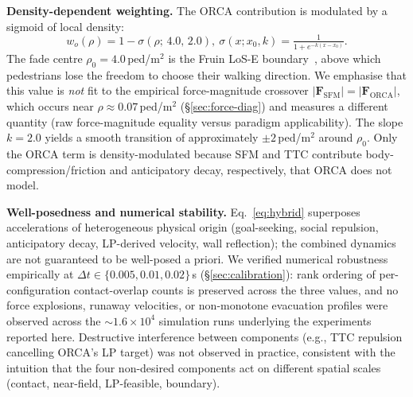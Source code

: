 \documentclass[a4paper,twoside]{article}
\begin{document}
\textbf{Density-dependent weighting.}
The ORCA contribution is modulated by a sigmoid of local density:
\begin{equation}\label{eq:sigmoid}
    w_o(\rho) = 1 - \sigma(\rho;\,4.0,\,2.0),\ \sigma(x;x_0,k) = \tfrac{1}{1+e^{-k(x-x_0)}}.
\end{equation}
The fade centre $\rho_0\!=\!4.0$\,ped/m$^2$ is the Fruin LoS-E boundary~\cite{Fruin71}, above which pedestrians lose the freedom to choose their walking direction. We emphasise that this value is \emph{not} fit to the empirical force-magnitude crossover $|\mathbf{F}_{\mathrm{SFM}}|\!=\!|\mathbf{F}_{\mathrm{ORCA}}|$, which occurs near $\rho\!\approx\!0.07$\,ped/m$^2$ (\S\ref{sec:force-diag}) and measures a different quantity (raw force-magnitude equality versus paradigm applicability). The slope $k\!=\!2.0$ yields a smooth transition of approximately $\pm 2$\,ped/m$^2$ around $\rho_0$. Only the ORCA term is density-modulated because SFM and TTC contribute body-compression/friction and anticipatory decay, respectively, that ORCA does not model.

\textbf{Well-posedness and numerical stability.}
Eq.~\eqref{eq:hybrid} superposes accelerations of heterogeneous physical origin (goal-seeking, social repulsion, anticipatory decay, LP-derived velocity, wall reflection); the combined dynamics are not guaranteed to be well-posed a priori. We verified numerical robustness empirically at $\Delta t\!\in\!\{0.005,0.01,0.02\}$\,s (\S\ref{sec:calibration}): rank ordering of per-configuration contact-overlap counts is preserved across the three values, and no force explosions, runaway velocities, or non-monotone evacuation profiles were observed across the $\sim\!1.6\!\times\!10^4$ simulation runs underlying the experiments reported here. Destructive interference between components (e.g., TTC repulsion cancelling ORCA's LP target) was not observed in practice, consistent with the intuition that the four non-desired components act on different spatial scales (contact, near-field, LP-feasible, boundary).
\end{document}
